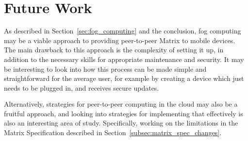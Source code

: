 \section{Future Work}
As described in Section~\ref{sec:fog_computing} and the conclusion, fog computing may be a viable approach to providing peer-to-peer Matrix to mobile devices.
The main drawback to this approach is the complexity of setting it up, in addition to the necessary skills for appropriate maintenance and security.
It may be interesting to look into how this process can be made simple and straightforward for the average user, for example by creating a device which just needs to be plugged in, and receives secure updates.

Alternatively, strategies for peer-to-peer computing in the cloud may also be a fruitful approach, and looking into strategies for implementing that effectively is also an interesting area of study.
Specifically, working on the limitations in the Matrix Specification described in Section~\ref{subsec:matrix_spec_changes}.